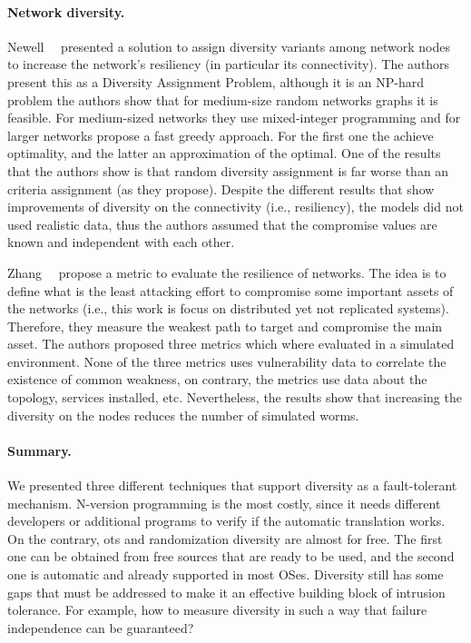 \paragraph{Network diversity.}
Newell~\etal{}~\cite{Newell:2015} presented a solution to assign diversity variants among network nodes to increase the network's resiliency (in particular its connectivity).
The authors present this as a Diversity Assignment Problem, although it is an NP-hard problem the authors show that for medium-size random networks graphs it is feasible.
For medium-sized networks they use mixed-integer programming and for larger networks propose a fast greedy approach.
For the first one the achieve optimality, and the latter an approximation of the optimal.
One of the results that the authors show is that random diversity assignment is far worse than an criteria assignment (as they propose).
Despite the different results that show improvements of diversity on the connectivity (i.e., resiliency), the models did not used realistic data, thus the authors assumed that the compromise values are known and independent with each other.


Zhang~\etal{}~\cite{Zhang:2016} propose a metric to evaluate the resilience of networks.
The idea is to define what is the least attacking effort to compromise some important assets of the networks (i.e., this work is focus on distributed yet not replicated systems).
Therefore, they measure the weakest path to target and compromise the main asset. 
The authors proposed three metrics which where evaluated in a simulated environment.
None of the three metrics uses vulnerability data to correlate the existence of common weakness, on contrary, the metrics use data about the topology, services installed, etc.
Nevertheless, the results show that increasing the diversity on the nodes reduces the number of simulated worms.
 


\paragraph{Summary.}
We presented three different techniques that support diversity as a fault-tolerant mechanism. 
N-version programming is the most costly, since it needs different developers or additional programs to verify if the automatic translation works. 
On the contrary, \gls{ots} and randomization diversity are almost for free. 
The first one can be obtained from free sources that are ready to be used, and the second one is automatic and already supported
in most OSes. 
Diversity still has some gaps that must be addressed to make it an effective building block of intrusion tolerance. 
For example, how to measure diversity in such a way that failure independence can be guaranteed?


